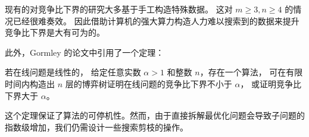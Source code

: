现有的对竞争比下界的研究大多基于手工构造特殊数据。
这对 $m\geq 3, n\geq 4$ 的情况已经很难奏效。
因此借助计算机的强大算力构造人力难以搜索到的数据来提升竞争比下界是大有可为的。

此外，Gormley 的论文中引用了一个定理：

\begin{thm}
    若在线问题是线性的，
    给定任意实数 $\alpha>1$ 和整数 $n$，存在一个算法，
    可在有限时间内构造出 $n$ 层的博弈树证明在线问题的竞争比下界不小于 $\alpha$，
    或证明竞争比下界大于 $\alpha$。
\end{thm}

这个定理保证了算法的可停机性。然而，由于直接拆解最优化问题会导致子问题的指数级增加，我们仍需设计一些搜索剪枝的操作。